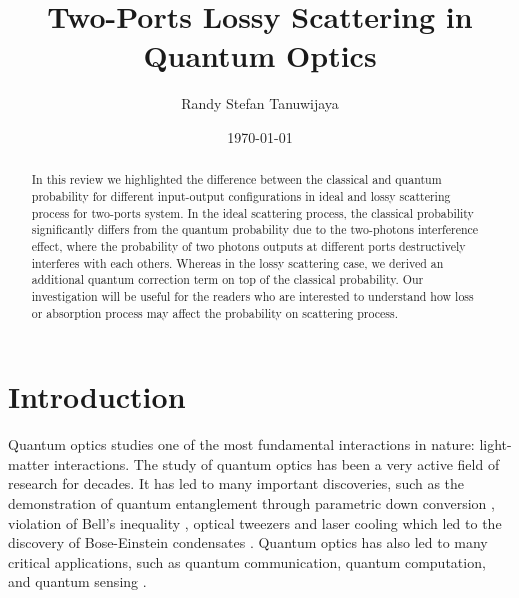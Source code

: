 \documentclass[%
 aps,
 reprint,
 twocolumn,
 amsmath,amssymb,
floatfix,
]{revtex4-2}
\begin{document}

\title{Two-Ports Lossy Scattering in Quantum Optics}

\author{Randy Stefan Tanuwijaya}

\date{\today}%

\begin{abstract}
	In this review we highlighted the difference between the classical and quantum probability for different input-output configurations in ideal and lossy scattering process for two-ports system. In the ideal scattering process, the classical probability significantly differs from the quantum probability due to the two-photons interference effect, where the probability of two photons outputs at different ports destructively interferes with each others. Whereas in the lossy scattering case, we derived an additional quantum correction term on top of the classical probability. Our investigation will be useful for the readers who are interested to understand how loss or absorption process may affect the probability on scattering process.
\end{abstract}
\maketitle


\section{Introduction}
\label{sec:intro}
Quantum optics studies one of the most fundamental interactions in nature: light-matter interactions. The study of quantum optics has been a very active field of research for decades. It has led to many important discoveries, such as the demonstration of quantum entanglement through parametric down conversion \cite{perina_spontaneous_2014}, violation of Bell's inequality \cite{aspect_experimental_1982}, optical tweezers and laser cooling which led to the discovery of Bose-Einstein condensates \cite{wineland_radiation-pressure_1978, ashkin_acceleration_1970}. Quantum optics has also led to many critical applications, such as quantum communication, quantum computation, and quantum sensing \cite{lloyd_any_1992, ball_physicists_2020, yung_polarization_2022}.
\end{document}
